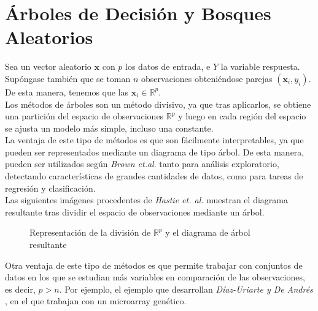 \newpage
\section{ Árboles de Decisión y Bosques Aleatorios}
\noindent Sea un vector aleatorio $\textbf{x}$ con $p$ los datos de entrada, e $Y$ la variable respuesta. Supóngase también que se toman $n$ observaciones obteniéndose parejas $(\textbf{x}_i,y_i)$. De esta manera, tenemos que las $\textbf{x}_i\in \mathbb{R}^p$.\\
Los métodos de árboles son un método divisivo, ya que tras aplicarlos, se obtiene una partición del espacio de observaciones $\mathbb{R}^p$ y luego en cada región del espacio se ajusta un modelo más simple, incluso una constante.\\
La ventaja de este tipo de métodos es que son fácilmente interpretables, ya que pueden ser representados mediante un diagrama de tipo árbol. De esta manera, pueden ser utilizados según \textit{Brown et.al}.\cite{Brown 2004} tanto para análisis exploratorio, detectando características de grandes cantidades de datos, como para tareas de regresión y clasificación. \\ 
Las  siguientes imágenes procedentes de \textit{Hastie et. al.}\cite{Hastie 2001} muestran el diagrama resultante tras dividir el espacio de observaciones mediante un árbol.

\begin{figure}[h]
 \centering
 \caption{Representación de la división de $\mathbb{R}^p$ y el diagrama de árbol resultante}
 \label{f:MARC1}
\end{figure}

\noindent Otra ventaja de este tipo de métodos es que permite trabajar con conjuntos de datos en los que se estudian más variables en comparación de las observaciones, es decir, $p > n$. Por ejemplo, el ejemplo que desarrollan \textit{Díaz-Uriarte y De Andrés} \cite{Diaz 2006}, en el que trabajan con un microarray genético. 

